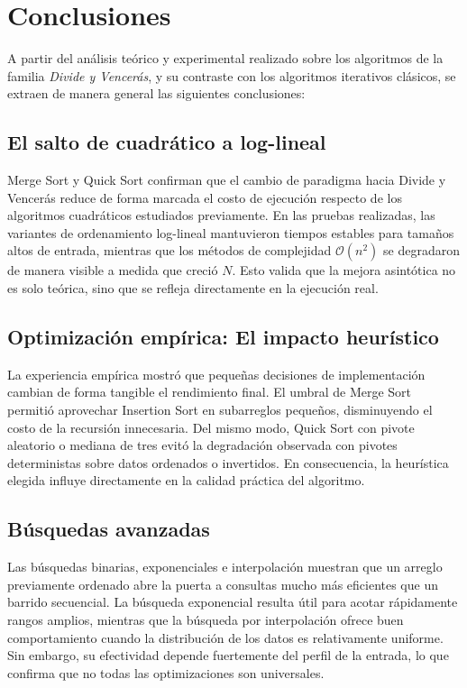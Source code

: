 \section{Conclusiones}\label{sec:conclusiones}
A partir del análisis teórico y experimental realizado sobre los algoritmos de la familia \textit{Divide y Vencerás}, y su contraste con los algoritmos iterativos clásicos, se extraen de manera general las siguientes conclusiones:

\subsection*{El salto de cuadrático a log-lineal}
\vspace{0.3cm}
\par \noindent Merge Sort y Quick Sort confirman que el cambio de paradigma hacia Divide y Vencerás reduce de forma marcada el costo de ejecución respecto de los algoritmos cuadráticos estudiados previamente. En las pruebas realizadas, las variantes de ordenamiento log-lineal mantuvieron tiempos estables para tamaños altos de entrada, mientras que los métodos de complejidad $\mathcal{O}(n^2)$ se degradaron de manera visible a medida que creció $N$. Esto valida que la mejora asintótica no es solo teórica, sino que se refleja directamente en la ejecución real.

\subsection*{Optimización empírica: El impacto heurístico}
\vspace{0.3cm}
\par \noindent La experiencia empírica mostró que pequeñas decisiones de implementación cambian de forma tangible el rendimiento final. El umbral de Merge Sort permitió aprovechar Insertion Sort en subarreglos pequeños, disminuyendo el costo de la recursión innecesaria. Del mismo modo, Quick Sort con pivote aleatorio o mediana de tres evitó la degradación observada con pivotes deterministas sobre datos ordenados o invertidos. En consecuencia, la heurística elegida influye directamente en la calidad práctica del algoritmo.

\subsection*{Búsquedas avanzadas}
\vspace{0.3cm}
\par \noindent Las búsquedas binarias, exponenciales e interpolación muestran que un arreglo previamente ordenado abre la puerta a consultas mucho más eficientes que un barrido secuencial. La búsqueda exponencial resulta útil para acotar rápidamente rangos amplios, mientras que la búsqueda por interpolación ofrece buen comportamiento cuando la distribución de los datos es relativamente uniforme. Sin embargo, su efectividad depende fuertemente del perfil de la entrada, lo que confirma que no todas las optimizaciones son universales.

